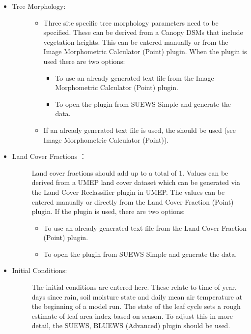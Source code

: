 \documentclass[letterpaper,10pt,english]{sphinxmanual}
\begin{document}
\begin{itemize}
\item {} \begin{description}
\item[{Tree Morphology:}] \leavevmode\begin{itemize}
\item {} 
Three site specific tree morphology parameters need to be specified. These can be derived from a Canopy DSMs that include vegetation heights. This can be entered manually or from the Image Morphometric Calculator (Point) plugin. When the plugin is used there are two options:
\begin{itemize}
\item {} 
To use an already generated text file from the Image Morphometric Calculator (Point) plugin.

\item {} 
To open the plugin from SUEWS Simple and generate the data.

\end{itemize}

\item {} 
If an already generated text file is used, the  should be used (see Image Morphometric Calculator (Point)).

\end{itemize}

\end{description}

\item {} \begin{description}
\item[{Land Cover Fractions ：}] \leavevmode
Land cover fractions should add up to a total of 1. Values can be derived from a UMEP land cover dataset which can be generated via the Land Cover Reclassifier plugin in UMEP. The values can be entered manually or directly from the Land Cover Fraction (Point) plugin. If the plugin is used, there are two options:
\begin{itemize}
\item {} 
To use an already generated text file from the Land Cover Fraction (Point) plugin.

\item {} 
To open the plugin from SUEWS Simple and generate the data.

\end{itemize}

\end{description}

\item {} \begin{description}
\item[{Initial Conditions:}] \leavevmode
The initial conditions are entered here. These relate to time of year, days since rain, soil moisture state and daily mean air temperature at the beginning of a model run. The state of the leaf cycle sets a rough estimate of leaf area index based on season. To adjust this in more detail, the SUEWS, BLUEWS (Advanced) plugin should be used.


\end{description}
\end{itemize}
\end{document}
